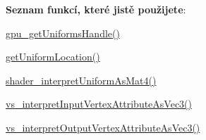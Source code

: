 \begin{DoxyRefList}
 {\bfseries Seznam funkcí, které jistě použijete}\+:
\begin{DoxyItemize}
\item \hyperlink{gpu_8h_a72dddc46dcba2d4e515fc23b61f0819a}{gpu\+\_\+get\+Uniforms\+Handle()}
\item \hyperlink{uniforms_8h_a6ea94982618b1c339a97a528b0670a53}{get\+Uniform\+Location()}
\item \hyperlink{uniforms_8h_a83cb2c94ffb0623e9bb8d9508885376a}{shader\+\_\+interpret\+Uniform\+As\+Mat4()}
\item \hyperlink{program_8h_a4bec56307c0d080bf314d20ff89773b2}{vs\+\_\+interpret\+Input\+Vertex\+Attribute\+As\+Vec3()}
\item \hyperlink{program_8h_a60d0546dc8c052ee90f699ddca3b540b}{vs\+\_\+interpret\+Output\+Vertex\+Attribute\+As\+Vec3()} 
\end{DoxyItemize}
\end{DoxyRefList}